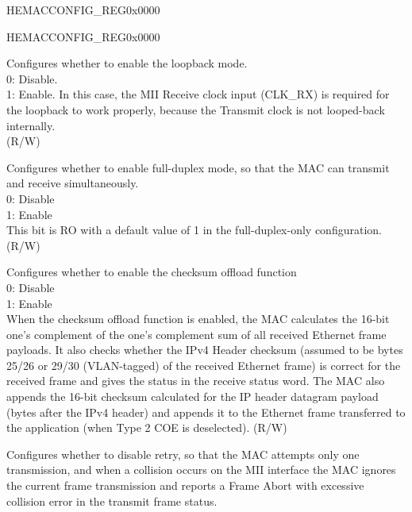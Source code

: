 \begin{register}{H}{EMACCONFIG\_REG}{0x0000}
\begin{regdesc}
\begin{reglist}
\item[Continued on the next page...]
\end{reglist}\end{regdesc}
\end{register}

\addtocounter{Regfloat}{-1}
\begin{register}{H}{EMACCONFIG\_REG}{0x0000}
\begin{regdesc}\begin{reglist}
\item[Continued from the previous page...]

\item [EMACLOOPBACK] Configures whether to enable the loopback mode.\\
0: Disable.\\
1: Enable. In this case, the MII Receive clock input (CLK\_RX) is required for the loopback to work properly, because the Transmit clock is not looped-back internally.\\(R/W)
\item [EMACDUPLEX] Configures whether to enable full-duplex mode, so that the MAC can transmit and receive simultaneously.\\
0: Disable\\
1: Enable\\
This bit is RO with a default value of 1 in the full-duplex-only configuration. (R/W)
\item [EMACRXIPCOFFLOAD] Configures whether to enable the checksum offload function\\
0: Disable\\
1: Enable\\
When the checksum offload function is enabled, the MAC calculates the 16-bit one's complement of the one's complement sum of all received Ethernet frame payloads. It also checks whether the IPv4 Header checksum (assumed to be bytes 25/26 or 29/30 (VLAN-tagged) of the received Ethernet frame) is correct for the received frame and gives the status in the receive status word. The MAC also appends the 16-bit checksum calculated for the IP header datagram payload (bytes after the IPv4 header) and appends it to the Ethernet frame transferred to the application (when Type 2 COE is deselected). (R/W)
\item [EMACRETRY] Configures whether to disable retry, so that the MAC attempts only one transmission, and when a collision occurs on the MII interface the MAC ignores the current frame transmission and reports a Frame Abort with excessive collision error in the transmit frame status.\\

\end{reglist}
\end{regdesc}
\end{register}
